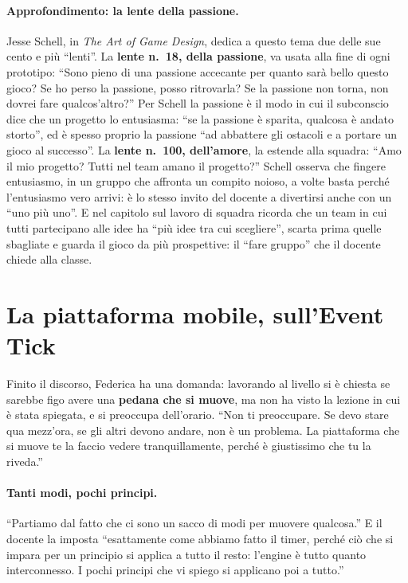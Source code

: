 \paragraph{Approfondimento: la lente della passione.} Jesse Schell, in \emph{The
Art of Game Design}, dedica a questo tema due delle sue cento e più ``lenti''. La
\textbf{lente n.~18, della passione}, va usata alla fine di ogni prototipo:
``Sono pieno di una passione accecante per quanto sarà bello questo gioco? Se
ho perso la passione, posso ritrovarla? Se la passione non torna, non dovrei
fare qualcos'altro?'' Per Schell la passione è il modo in cui il subconscio dice
che un progetto lo entusiasma: ``se la passione è sparita, qualcosa è andato
storto'', ed è spesso proprio la passione ``ad abbattere gli ostacoli e a portare
un gioco al successo''. La \textbf{lente n.~100, dell'amore}, la estende alla
squadra: ``Amo il mio progetto? Tutti nel team amano il progetto?'' Schell
osserva che fingere entusiasmo, in un gruppo che affronta un compito noioso, a
volte basta perché l'entusiasmo vero arrivi: è lo stesso invito del docente a
divertirsi anche con un ``uno più uno''. E nel capitolo sul lavoro di squadra
ricorda che un team in cui tutti partecipano alle idee ha ``più idee tra cui
scegliere'', scarta prima quelle sbagliate e guarda il gioco da più prospettive:
il ``fare gruppo'' che il docente chiede alla classe.

\section{La piattaforma mobile, sull'Event Tick}
\label{gd13:sec:piattaforma-tick}

Finito il discorso, Federica ha una domanda: lavorando al livello si è chiesta
se sarebbe figo avere una \textbf{pedana che si muove}, ma non ha visto la
lezione in cui è stata spiegata, e si preoccupa dell'orario. ``Non ti
preoccupare. Se devo stare qua mezz'ora, se gli altri devono andare, non è un
problema. La piattaforma che si muove te la faccio vedere tranquillamente,
perché è giustissimo che tu la riveda.''

\paragraph{Tanti modi, pochi principi.} ``Partiamo dal fatto che ci sono un sacco
di modi per muovere qualcosa.'' E il docente la imposta ``esattamente come
abbiamo fatto il timer, perché ciò che si impara per un principio si applica a
tutto il resto: l'engine è tutto quanto interconnesso. I pochi principi che vi
spiego si applicano poi a tutto.''

